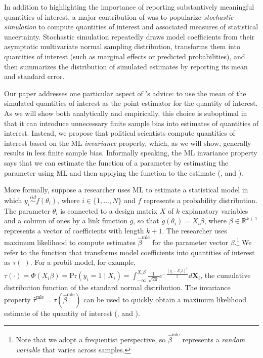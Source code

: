 \documentclass[11pt]{article}
\begin{document}
In addition to highlighting the importance of reporting substantively meaningful quantities of interest, a major contribution of \cite{KingTomzWittenberg2000} was to popularize {\it stochastic simulation} to compute quantities of interest and associated measures of statistical uncertainty. Stochastic simulation repeatedly draws model coefficients from their asymptotic multivariate normal sampling distribution, transforms them into quantities of interest (such as marginal effects or predicted probabilities), and then summarizes the distribution of simulated estimates by reporting its mean and standard error.

Our paper addresses one particular aspect of \cite{KingTomzWittenberg2000}'s advice: to use the mean of the simulated quantities of interest as the point estimator for the quantity of interest. As we will show both analytically and empirically, this choice is suboptimal in that it can introduce unnecessary finite sample bias into estimates of quantities of interest. Instead, we propose that political scientists compute quantities of interest based on the ML {\it invariance} property, which, as we will show, generally results in less finite sample bias. Informally speaking, the ML invariance property says that we can estimate the function of a parameter by estimating the parameter using ML and then applying the function to the estimate (\citealt[pp. 75-76]{King1989}, and \citealt[pp. 320-321]{CasellaBerger2002}).

More formally, suppose a researcher uses ML to estimate a statistical model in which $y_i \stackrel{iid}{\sim} f(\theta_i)$, where $i \in \{1,\ldots, N\}$ and $f$ represents a probability distribution. The parameter $\theta_i$ is connected to a design matrix $X$ of $k$ explanatory variables and a column of ones by a link function $g$, so that $g(\theta_i) = X_i\beta$, where $\beta \in \mathbb{R}^{k+1}$ represents a vector of coefficients with length $k + 1$. The researcher uses maximum likelihood to compute estimates $\hat{\beta}^{\text{mle}}$ for the parameter vector $\beta$.\footnote{Note that we adopt a frequentist perspective, so $\hat{\beta}^{\text{mle}}$ represents a \emph{random variable} that varies across samples.} We refer to the function that transforms model coefficients into quantities of interest as $\tau(\cdot)$. For a probit model, for example, $\tau(\cdot) = \Phi( X_i \beta) = \text{Pr}(y_i = 1 \mid  X_i) = \int_{-\infty} ^{X_i \beta} \frac {1} {\sqrt{2\pi}} e^{-\frac {\left(y_i - X_i \beta\right)^2} {2}} d\mathbf X_i$, the cumulative distribution function of the standard normal distribution. The invariance property $\hat{\tau}^{\text{mle}} = \tau \left( \hat{\beta}^{\text{mle}}\right)$ can be used to quickly obtain a maximum likelihood estimate of the quantity of interest (\citealt[pp. 75-76]{King1989}, and \citealt[pp. 320-321]{CasellaBerger2002}).
\end{document}
